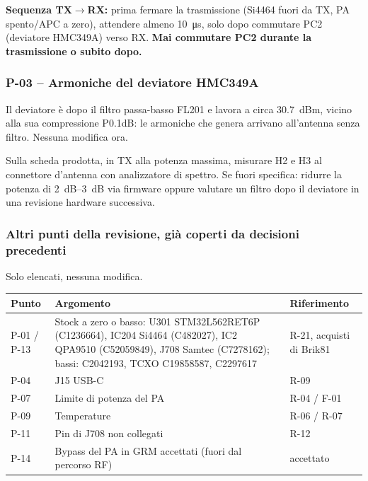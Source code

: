\begin{tcolorbox}[enhanced,breakable,colback=boxokbg,colframe=boxok,boxrule=0.8pt,left=7pt,right=6pt,top=4pt,bottom=4pt,
  title={\sffamily\bfseries Nota firmware F-14 \textendash{} per il firmwarista (sequenza TX$\rightarrow$RX)},fonttitle=\small,coltitle=white,colbacktitle=boxok]
\textbf{Sequenza TX$\rightarrow$RX:} prima fermare la trasmissione (Si4464 fuori da TX, PA spento/APC a zero), attendere almeno \SI{10}{\micro\second}, solo dopo commutare PC2 (deviatore HMC349A) verso RX. \textbf{Mai commutare PC2 durante la trasmissione o subito dopo.}
\end{tcolorbox}

\subsubsection{P-03 -- Armoniche del deviatore HMC349A}
Il deviatore è dopo il filtro passa-basso FL201 e lavora a circa \SI{30.7}{dBm}, vicino alla sua compressione P0.1dB: le armoniche che genera arrivano all'antenna senza filtro. Nessuna modifica ora.

\begin{tcolorbox}[enhanced,breakable,colback=boxwarnbg,colframe=boxwarn,boxrule=0.8pt,left=7pt,right=6pt,top=3pt,bottom=3pt,
  title={\sffamily\bfseries Misura M-05 al collaudo},fonttitle=\small,coltitle=white,colbacktitle=boxwarn]
Sulla scheda prodotta, in TX alla potenza massima, misurare H2 e H3 al connettore d'antenna con analizzatore di spettro. Se fuori specifica: ridurre la potenza di \SIrange{2}{3}{dB} via firmware oppure valutare un filtro dopo il deviatore in una revisione hardware successiva.
\end{tcolorbox}

\subsubsection{Altri punti della revisione, già coperti da decisioni precedenti}
Solo elencati, nessuna modifica.

{\small{}
\begin{tabularx}{\linewidth}{@{}lXl@{}}
\toprule
\textbf{Punto} & \textbf{Argomento} & \textbf{Riferimento}\\
\midrule
P-01 / P-13 & Stock a zero o basso: U301 STM32L562RET6P (C1236664), IC204 Si4464 (C482027), IC2 QPA9510 (C52059849), J708 Samtec (C7278162); bassi: C2042193, TCXO C19858587, C2297617 & R-21, acquisti di Brik81\\
P-04 & J15 USB-C & R-09\\
P-07 & Limite di potenza del PA & R-04 / F-01\\
P-09 & Temperature & R-06 / R-07\\
P-11 & Pin di J708 non collegati & R-12\\
P-14 & Bypass del PA in GRM accettati (fuori dal percorso RF) & accettato\\
\bottomrule
\end{tabularx}}

